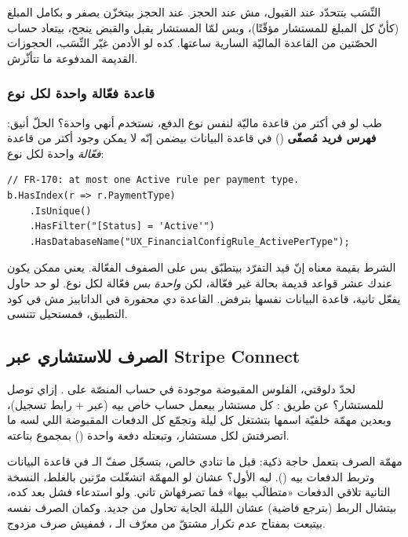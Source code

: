 \begin{note}
النِّسَب بتتحدّد عند القبول، مش عند الحجز. عند الحجز بيتخزّن
 بصفر و بكامل المبلغ (كأنّ
كل المبلغ للمستشار مؤقّتًا)، وبس لمّا المستشار يقبل والقبض ينجح، بيتعاد حساب
الحصّتين من القاعدة الماليّة السارية ساعتها. كده لو الأدمن غيّر النِّسَب، الحجوزات
القديمة المدفوعة ما تتأثّرش.
\end{note}

\subsubsection{قاعدة فعّالة واحدة لكل نوع}

طب لو في أكتر من قاعدة ماليّة لنفس نوع الدفع، نستخدم أنهي واحدة؟ الحلّ أنيق:
\textbf{فهرس فريد مُصفّى} () في قاعدة البيانات بيضمن إنّه
لا يمكن وجود أكتر من قاعدة \emph{فعّالة} واحدة لكل نوع:

\begin{english}
\begin{lstlisting}[language={[Sharp]C}]
// FR-170: at most one Active rule per payment type.
b.HasIndex(r => r.PaymentType)
    .IsUnique()
    .HasFilter("[Status] = 'Active'")
    .HasDatabaseName("UX_FinancialConfigRule_ActivePerType");
\end{lstlisting}
\end{english}

الشرط  بقيمة  معناه إنّ قيد التفرّد
بيتطبّق بس على الصفوف الفعّالة. يعني ممكن يكون عندك عشر قواعد قديمة بحالة غير
فعّالة، لكن \emph{واحدة بس} فعّالة لكل نوع. لو حد حاول يفعّل تانية، قاعدة البيانات
نفسها بترفض. القاعدة دي محفورة في الداتابيز مش في كود التطبيق، فمستحيل تتنسى.

\subsection{الصرف للاستشاري عبر Stripe Connect}

لحدّ دلوقتي، الفلوس المقبوضة موجودة في حساب المنصّة على . إزاي توصل
للمستشار؟ عن طريق : كل مستشار بيعمل حساب  خاص بيه
(عبر  + رابط تسجيل)، وبعدين مهمّة خلفيّة اسمها
 بتشتغل كل ليلة وتجمّع كل الدفعات المقبوضة اللي لسه ما
اتصرفتش لكل مستشار، وتبعتله دفعة واحدة () بمجموع 
بتاعته.

\begin{idea}
مهمّة الصرف بتعمل حاجة ذكية: قبل ما تنادي  خالص، بتسجّل صفّ الـ
 في قاعدة البيانات وتربط الدفعات بيه (). ليه الأول؟
عشان لو المهمّة اتشغّلت مرّتين بالغلط، النسخة التانية تلاقي الدفعات «متطالَب بيها»
فما تصرفهاش تاني. ولو استدعاء  فشل بعد كده، بيتشال الربط
(بترجع  فاضية) عشان الليلة الجاية تحاول من جديد. وكمان الصرف نفسه
بيتبعت بمفتاح عدم تكرار مشتقّ من معرّف الـ ، فمفيش صرف مزدوج.
\end{idea}

